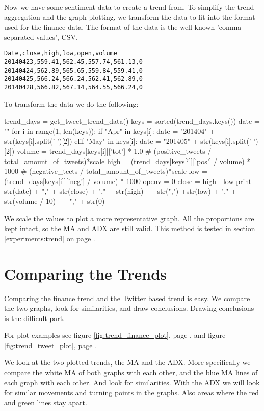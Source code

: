 Now we have some sentiment data to create a trend from. To simplify the trend
aggregation and the graph plotting, we transform the data to fit into the
format used for the finance data. The format of the data is the well known
'comma separated values', CSV.  

\begin{verbatim}
Date,close,high,low,open,volume
20140423,559.41,562.45,557.74,561.13,0
20140424,562.89,565.65,559.84,559.41,0
20140425,566.24,566.24,562.41,562.89,0
20140428,566.82,567.14,564.55,566.24,0
\end{verbatim}

To transform the data we do the following: 
\begin{python}
trend_days = get_tweet_trend_data()
keys = sorted(trend_days.keys())
date = ""
for i in range(1, len(keys)):
    if "Apr" in keys[i]:
        date = "201404" + str(keys[i].split('-')[2])
    elif "May" in keys[i]:
        date = "201405" + str(keys[i].split('-')[2])
    volume = trend_days[keys[i]]['tot'] * 1.0
    # (positive_tweets / total_amount_of_tweets)*scale
    high = (trend_days[keys[i]]['pos'] / volume) * 1000
    # (negative_teets / total_amount_of_tweets)*scale
    low = (trend_days[keys[i]]['neg'] / volume) * 1000
    openv = 0
    close = high - low
    print str(date) + "," + str(close) + "," + str(high) \
          + str(",") +str(low) + "," + str(volume / 10) + \
          "," + str(0)
\end{python}

We scale the values to plot a more representative graph. All the
proportions are kept intact, so the MA and ADX are still valid.
This method is tested in section \ref{experiments:trend} on page
\pageref{experiments:trend}.
% 

\section{Comparing the Trends}\label{trend:compared}
Comparing the finance trend and the Twitter based trend is easy. We compare the
two graphs, look for similarities, and draw conclusions. Drawing conclusions is
the difficult part.

For plot examples see figure \ref{fig:trend_finance_plot}, page
\pageref{fig:trend_finance_plot}, and figure \ref{fig:trend_tweet_plot}, page
\pageref{fig:trend_tweet_plot}.

We look at the two plotted trends, the MA and the ADX. More specifically we
compare the white MA of both graphs with each other, and the blue MA lines of
each graph with each other. And look for similarities. With the ADX we will look
for similar movements and turning points in the graphs. Also areas where the
red and green lines stay apart.  


